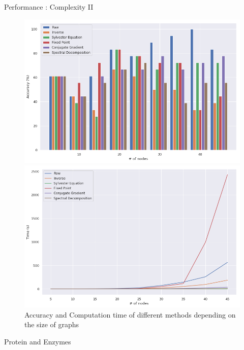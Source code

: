 \documentclass[compress]{beamer}
\begin{document}
\begin{frame}{Performance : Complexity II}
\begin{figure}[!htb]
	\begin{multicols}{2}
		\includegraphics[width=\linewidth]{data/nb_nodes/acc.png}\par
		\includegraphics[width=\linewidth]{data/nb_nodes/time.png}\par
	\end{multicols}
	\caption*{Accuracy and Computation time of different methods depending on the size of graphs}
\end{figure}
\end{frame}
\begin{frame}{Protein and Enzymes}

\end{frame}
\end{document}
